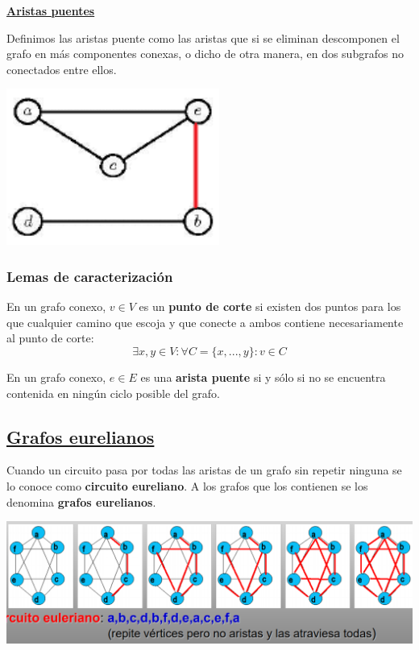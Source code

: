 \documentclass[10pt,a4paper,openright]{book}
\begin{document}
\underline{\textbf{Aristas puentes}}

Definimos las aristas puente como las aristas que si se eliminan descomponen el grafo en más componentes conexas, o dicho de otra manera, en dos subgrafos no conectados entre ellos.

\begin{center}
\includegraphics[scale=0.65]{arista puente}
\end{center}

\subsubsection*{Lemas de caracterización}
En un grafo conexo, $v\in V$ es un \textbf{punto de corte} si existen dos puntos para los que cualquier camino que escoja y que conecte a ambos contiene necesariamente al punto de corte:
$$\exists x, y \in V: \forall C=\{x, ..., y\}: v\in C$$

En un grafo conexo, $e\in E$ es una \textbf{arista puente} si y sólo si no se encuentra contenida en ningún ciclo posible del grafo.

\subsection*{\underline{Grafos eurelianos}}
Cuando un circuito pasa por todas las aristas de un grafo sin repetir ninguna se lo conoce como \textbf{circuito eureliano}. A los grafos que los contienen se los denomina \textbf{grafos eurelianos}.

\begin{center}
\includegraphics[scale=0.55]{grafo eureliano}
\end{center}
\end{document}
